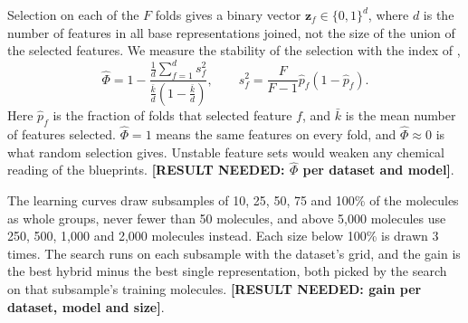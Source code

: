 Selection on each of the $F$ folds gives a binary vector $\mathbf{z}_f \in \{0,1\}^d$, where $d$ is the number of features in all base representations joined, not the size of the union of the selected features. We measure the stability of the selection with the index of \citet{Nogueira2018},
\[
\hat\Phi = 1 - \frac{\frac1d\sum_{f=1}^d s_f^2}{\frac{\bar k}{d}\left(1-\frac{\bar k}{d}\right)}, \qquad s_f^2 = \frac{F}{F-1}\hat p_f(1-\hat p_f).
\]
Here $\hat p_f$ is the fraction of folds that selected feature $f$, and $\bar k$ is the mean number of features selected. $\hat\Phi=1$ means the same features on every fold, and $\hat\Phi \approx 0$ is what random selection gives. Unstable feature sets would weaken any chemical reading of the blueprints. \textbf{[RESULT NEEDED: $\hat\Phi$ per dataset and model]}.

The learning curves draw subsamples of 10, 25, 50, 75 and 100\% of the molecules as whole groups, never fewer than 50 molecules, and above 5,000 molecules use 250, 500, 1,000 and 2,000 molecules instead. Each size below 100\% is drawn 3 times. %
The search runs on each subsample with the dataset's grid, and the gain is the best hybrid minus the best single representation, both picked by the search on that subsample's training molecules. \textbf{[RESULT NEEDED: gain per dataset, model and size]}.

